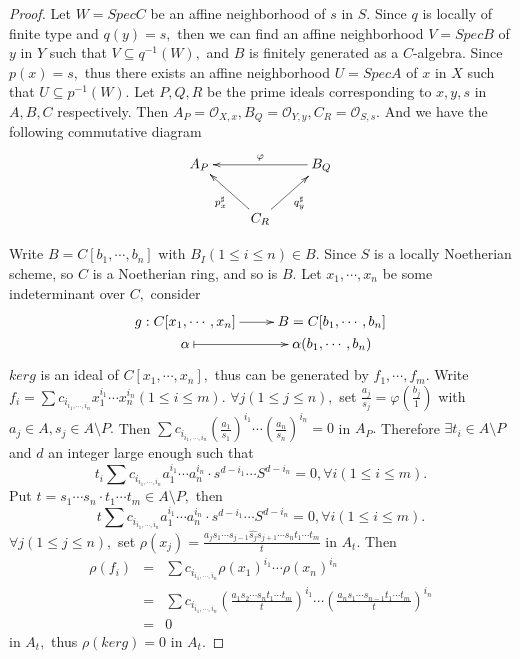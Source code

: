 \begin{proof}
Let $W=SpecC$ be an affine neighborhood of $s$ in $S.$ Since $q$ is
locally of finite type and $q(y)=s,$ then we can find an affine
neighborhood $V=SpecB$ of $y$ in $Y$ such that $V\subseteq
q^{-1}(W),$ and $B$ is finitely generated as a $C$-algebra. Since
$p(x)=s,$ thus there exists an affine neighborhood $U=SpecA$ of $x$
in $X$ such that $U\subseteq p^{-1}(W).$ Let $P,Q,R$ be the prime
ideals corresponding to $x,y,s$ in $A,B,C$ respectively. Then
$A_P=\mathcal {O}_{X,x},B_Q=\mathcal {O}_{Y,y},C_R=\mathcal
{O}_{S,s}.$ And we have the following commutative diagram
\[ \xymatrix{
   A_P & & B_Q \ar[ll]_{\varphi}                          \\
   & C_R \ar[ul]^{p_x^{\sharp}} \ar[ur]_{q_y^{\sharp}} }  \]

Write $B=C[b_1,\cdots,b_n]$ with $B_I(1\leqslant i\leqslant n)\in
B.$ Since $S$ is a locally Noetherian scheme, so $C$ is a Noetherian
ring, and so is $B.$ Let $x_1,\cdots,x_n$ be some indeterminant over
$C,$ consider
\[ \xymatrix@R=0em{
   {g: C[x_1,\cdots,x_n]} \ar[r] & {B=C[b_1,\cdots,b_n]}  \\
   \alpha \ar@{|->}[r] & {\alpha(b_1,\cdots,b_n)} }  \]
$ker g$ is an ideal of $C[x_1,\cdots,x_n],$ thus can be generated by
$f_1,\cdots,f_m.$ Write $f_i=\sum
c_{i_{i_1,\cdots,i_n}}x_1^{i_1}\cdots x_n^{i_n}(1\leqslant
i\leqslant m).$ $\forall j(1\leqslant j\leqslant n),$ set
$\frac{a_j}{s_j}=\varphi(\frac{b_j}{1})$ with $a_j\in A, s_j\in
A\setminus P.$ Then $\sum
c_{i_{i_1,\cdots,i_n}}(\frac{a_1}{s_1})^{i_1}\cdots
(\frac{a_n}{s_n})^{i_n}=0$ in $A_P.$ Therefore $\exists t_i\in
A\setminus P$ and $d$ an integer large enough such that
$$t_i\sum c_{i_{i_1,\cdots,i_n}}a_1^{i_1}\cdots a_n^{i_n}\cdot s^{d-i_1}
\cdots S^{d-i_n}=0,\forall i(1\leqslant i\leqslant m).$$ Put
$t=s_1\cdots s_n\cdot t_1\cdots t_m\in A\setminus P,$ then
$$t\sum c_{i_{i_1,\cdots,i_n}}a_1^{i_1}\cdots a_n^{i_n}\cdot s^{d-i_1}
\cdots S^{d-i_n}=0,\forall i(1\leqslant i\leqslant m).$$ $\forall
j(1\leqslant j\leqslant n),$ set $\rho(x_j)=\frac{a_js_1\cdots
s_{j-1}\widehat{s_j}s_{j+1}\cdots s_nt_1\cdots t_m}{t}$ in $A_t.$
Then
\begin{eqnarray*}
\rho(f_i) & = & \sum c_{i_{i_1,\cdots,i_n}}\rho(x_1)^{i_1}\cdots
\rho(x_n)^{i_n}                                                \\
& = & \sum c_{i_{i_1,\cdots,i_n}}(\frac{a_1s_2\cdots s_nt_1\cdots
t_m}{t})^{i_1}\cdots (\frac{a_ns_1\cdots s_{n-1}t_1\cdots
t_m}{t})^{i_n}                                                 \\
& = & 0
\end{eqnarray*}
in $A_t,$ thus $\rho(ker g)=0$ in $A_t.$


\end{proof}
